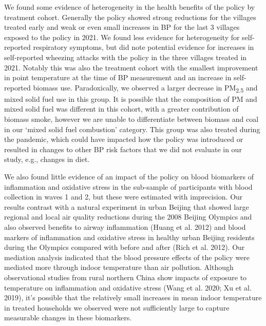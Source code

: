 \documentclass[
  letterpaper,
  DIV=11,
  numbers=noendperiod]{scrartcl}
\providecommand{\DIFaddtex}[1]{{\protect\color{blue}\uwave{#1}}} %
\providecommand{\DIFaddbegin}{} %
\providecommand{\DIFaddend}{} %
\providecommand{\DIFdelbegin}{} %
\providecommand{\DIFdelend}{} %
\providecommand{\DIFadd}[1]{\texorpdfstring{\DIFaddtex{#1}}{#1}} %
\newcommand{\DIFscaledelfig}{0.5}
\newlength{\DIFdelgraphicswidth} %
\newlength{\DIFdelgraphicsheight} %
\newcommand{\DIFaddincludegraphics}[2][]{{\color{blue}\fbox{\DIFOincludegraphics[#1]{#2}}}} %
\newcommand{\DIFdelincludegraphics}[2][]{%
\sbox{\DIFdelgraphicsbox}{\DIFOincludegraphics[#1]{#2}}%
\settoboxwidth{\DIFdelgraphicswidth}{\DIFdelgraphicsbox} %
\settoboxtotalheight{\DIFdelgraphicsheight}{\DIFdelgraphicsbox} %
\scalebox{\DIFscaledelfig}{%
\parbox[b]{\DIFdelgraphicswidth}{\usebox{\DIFdelgraphicsbox}\\[-\baselineskip] \rule{\DIFdelgraphicswidth}{0em}}\llap{\resizebox{\DIFdelgraphicswidth}{\DIFdelgraphicsheight}{%
\setlength{\unitlength}{\DIFdelgraphicswidth}%
\begin{picture}(1,1)%
\thicklines\linethickness{2pt} %
{\color[rgb]{1,0,0}\put(0,0){\framebox(1,1){}}}%
{\color[rgb]{1,0,0}\put(0,0){\line( 1,1){1}}}%
{\color[rgb]{1,0,0}\put(0,1){\line(1,-1){1}}}%
\end{picture}%
}\hspace*{3pt}}} %
} %
\DeclareRobustCommand{\DIFaddbegin}{\DIFOaddbegin \let\includegraphics\DIFaddincludegraphics} %
\DeclareRobustCommand{\DIFaddend}{\DIFOaddend \let\includegraphics\DIFOincludegraphics} %
\DeclareRobustCommand{\DIFdelbegin}{\DIFOdelbegin \let\includegraphics\DIFdelincludegraphics} %
\DeclareRobustCommand{\DIFdelend}{\DIFOaddend \let\includegraphics\DIFOincludegraphics} %
\begin{document}
We found some evidence of heterogeneity in the health benefits of the
policy by treatment cohort. Generally the policy showed strong
reductions for the villages treated early and weak or even small
increases in BP for the last 3 villages exposed to the policy in 2021.
We found less evidence for heterogeneity for self-reported respiratory
symptoms, but did note potential evidence for increases in self-reported
wheezing attacks with the policy in the three villages treated in 2021.
Notably this was also the treatment cohort with the smallest improvement
in point temperature at the time of BP measurement and an increase in
self-reported biomass use. Paradoxically, we observed a larger decrease
in PM\textsubscript{2.5} and mixed solid fuel use in this group. It is
possible that the composition of PM and mixed solid fuel was different
in this cohort, with a greater contribution of biomass smoke, however we
are unable to differentiate between biomass and coal in our `mixed solid
fuel combustion' category. This group was also treated during the
pandemic, which could have impacted how the policy was introduced or
resulted in changes to other BP risk factors that we did not evaluate in
our study, e.g., changes in diet.

We also found little evidence of an impact of the policy on blood
biomarkers of inflammation and oxidative stress in the sub-sample of
participants with blood collection in waves 1 and 2, but these were
estimated with imprecision. Our results contrast with a natural
experiment in urban Beijing that showed large regional and local air
quality reductions during the 2008 Beijing Olympics and also observed
benefits to airway inflammation (Huang et al. 2012) and blood markers of
inflammation and oxidative stress in healthy urban Beijing residents
during the Olympics compared with before and after (Rich et al. 2012).
Our mediation analysis indicated that the blood pressure effects of the
policy were mediated more through indoor temperature than air pollution.
Although observational studies from rural northern China show impacts of
exposure to temperature on inflammation and oxidative stress (Wang et
al. 2020; Xu et al. 2019), it's possible that the relatively small
increases in mean indoor temperature in treated households we observed
were not sufficiently large to capture measurable changes in these
biomarkers.

\DIFdelbegin %
\DIFdelend \DIFaddbegin \subsection{\DIFadd{Impacts of the policy on air pollution and its
sources}}\label{impacts-of-the-policy-on-air-pollution-and-its-sources}
\DIFaddend 
\end{document}
